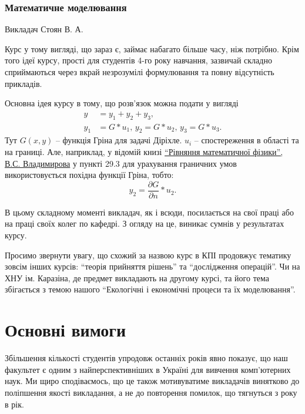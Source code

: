 \documentclass[14pt, a4paper]{extarticle}  %
\begin{document}
\subsubsection{Математичне моделювання}
Викладач Стоян В. А. 

Курс у тому вигляді, що зараз є, займає набагато більше часу, ніж потрібно. Крім того ідеї курсу, прості для студентів 4-го року навчання, зазвичай складно сприймаються через вкрай незрозумілі формулювання та повну відсутність прикладів. 

Основна ідея курсу в тому, що розв'язок можна подати у вигляді 
\begin{align*}
   y &= y_1 + y_2 + y_3, \\
   y_1 &= G * u_1, \, y_2 = G * u_2, \, y_3 = G * u_3.
\end{align*}
Тут $G(x, y)$ -- функція Гріна для задачі Діріхле. $u_i$ -- спостереження в області та на границі. Але, наприклад, у відомій книзі \href{http://cmcstuff.esyr.org/vmkbotva-r15/4\%20\%D0\%BA\%D1\%83\%D1\%80\%D1\%81/8\%20\%D0\%A1\%D0\%B5\%D0\%BC\%D0\%B5\%D1\%81\%D1\%82\%D1\%80/PDE\%20Extra\%20Chapters\%20\%5BHapaev\%20M.M.\%5D/\%D0\%92.\%D0\%A1.\%20\%D0\%92\%D0\%BB\%D0\%B0\%D0\%B4\%D0\%B8\%D0\%BC\%D0\%B8\%D1\%80\%D0\%BE\%D0\%B2.\%20\%D0\%A3\%D1\%80\%D0\%B0\%D0\%B2\%D0\%BD\%D0\%B5\%D0\%BD\%D0\%B8\%D1\%8F\%20\%D0\%BC\%D0\%B0\%D1\%82\%D0\%B5\%D0\%BC\%D0\%B0\%D1\%82\%D0\%B8\%D1\%87\%D0\%B5\%D1\%81\%D0\%BA\%D0\%BE\%D0\%B9\%20\%D1\%84\%D0\%B8\%D0\%B7\%D0\%B8\%D0\%BA\%D0\%B8.pdf}{``Рівняння математичної фізики'', В.С. Владимирова} у пункті 29.3 для урахування граничних умов використовується похідна функції Гріна, тобто:
\[ y_2 = \frac{\partial G}{\partial n} * u_2. \]

В цьому складному моменті викладач, як і всюди, посилається на свої праці або на праці своїх колег по кафедрі. З огляду на це, виникає сумнів у результатах курсу. 

Просимо звернути увагу, що схожий за назвою курс в КПІ продовжує тематику зовсім інших курсів: ``теорія прийняття рішень'' та ``дослідження операцій''. Чи на ХНУ ім. Каразіна, де предмет викладають на другому курсі, та його тема збігається з темою нашого ``Екологічні і економічні процеси та їх моделювання''. 


\newpage

\section{Основні вимоги}
Збільшення кількості студентів упродовж останніх років явно показує, що наш факультет є одним з найперспективніших в Україні для вивчення комп'ютерних наук. Ми щиро сподіваємось, що це також мотивуватиме викладачів винятково до поліпшення якості викладання, а не до повторення помилок, що тягнуться з року в рік. 
\end{document}
